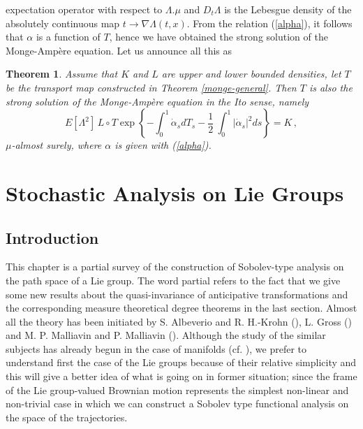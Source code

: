 \documentclass[12pt,a4paper]{book}
\newtheorem{theorem}{Theorem}[section]
\newcommand{\La}{\Lambda}
\newcommand{\half}{\frac{1}{2}\:}
\begin{document}
expectation operator with respect to $\La.\mu$ and $D_t\La$ is the
Lebesgue density of the absolutely continuous map $t\to
\nabla\La(t,x)$. From the relation (\ref{alpha}), it follows that  $\alpha$ is 
a function of $T$, hence we have obtained the strong solution of the
Monge-Amp\`ere equation. Let us announce all this as 
\begin{theorem}
\label{monge-amp.2}
Assume that $K$ and $L$ are upper and lower bounded densities, let $T$
be the transport map constructed in Theorem \ref{monge-general}. Then
$T$ is also the strong solution of the Monge-Amp\`ere equation in the
Ito sense, namely 
$$
E[\La^2]\,L\circ T
\exp\left\{-\int_0^1\dot{\alpha}_sdT_s-\half\int_0^1|\dot{\alpha}_s|^2ds\right\}=K\,,
$$
$\mu$-almost surely, where $\alpha$ is given with (\ref{alpha}).
\end{theorem}












%


\chapter{Stochastic Analysis on Lie Groups}
\label{ch.lie}
\section*{Introduction}
This chapter  is a partial survey of the construction of  Sobolev-type
analysis on the path space of  a Lie group. The word partial refers to
the fact that we
give some  new results about the quasi-invariance of  anticipative
transformations and the corresponding measure theoretical degree theorems   in
the last section. Almost all the theory has been initiated by S.  Albeverio and
R. H.-Krohn (\cite{A-HK}), L. Gross (\cite{G1,G2}) and M. P. Malliavin and
P. Malliavin (\cite{M-M1}). Although the study of the similar subjects has
already begun in the case of manifolds (cf. \cite{C-M}), we prefer to
understand first the case of the Lie groups because of their relative
simplicity and  this will give a better idea of what is going on in former
situation; since the frame of the Lie group-valued Brownian motion represents
the simplest non-linear and non-trivial  case in which we can construct a
Sobolev type functional analysis on the space of the trajectories.
\end{document}

